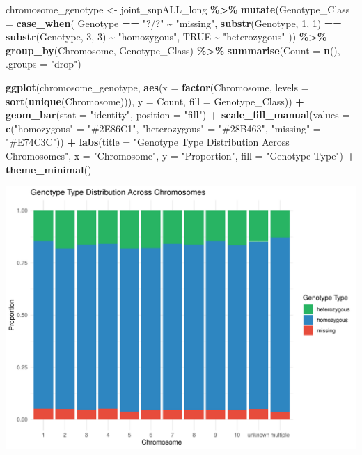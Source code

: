 \documentclass[
]{article}
\newenvironment{Shaded}{\begin{snugshade}}{\end{snugshade}}
\newcommand{\AttributeTok}[1]{\textcolor[rgb]{0.13,0.29,0.53}{#1}}
\newcommand{\ConstantTok}[1]{\textcolor[rgb]{0.56,0.35,0.01}{#1}}
\newcommand{\DecValTok}[1]{\textcolor[rgb]{0.00,0.00,0.81}{#1}}
\newcommand{\FunctionTok}[1]{\textcolor[rgb]{0.13,0.29,0.53}{\textbf{#1}}}
\newcommand{\NormalTok}[1]{#1}
\newcommand{\OtherTok}[1]{\textcolor[rgb]{0.56,0.35,0.01}{#1}}
\newcommand{\SpecialCharTok}[1]{\textcolor[rgb]{0.81,0.36,0.00}{\textbf{#1}}}
\newcommand{\StringTok}[1]{\textcolor[rgb]{0.31,0.60,0.02}{#1}}
\begin{document}
\begin{Shaded}
\begin{Highlighting}[]
\NormalTok{chromosome\_genotype }\OtherTok{\textless{}{-}}\NormalTok{ joint\_snpALL\_long }\SpecialCharTok{\%\textgreater{}\%}
  \FunctionTok{mutate}\NormalTok{(}\AttributeTok{Genotype\_Class =} \FunctionTok{case\_when}\NormalTok{(}
\NormalTok{    Genotype }\SpecialCharTok{==} \StringTok{"?/?"} \SpecialCharTok{\textasciitilde{}} \StringTok{"missing"}\NormalTok{,}
    \FunctionTok{substr}\NormalTok{(Genotype, }\DecValTok{1}\NormalTok{, }\DecValTok{1}\NormalTok{) }\SpecialCharTok{==} \FunctionTok{substr}\NormalTok{(Genotype, }\DecValTok{3}\NormalTok{, }\DecValTok{3}\NormalTok{) }\SpecialCharTok{\textasciitilde{}} \StringTok{"homozygous"}\NormalTok{,}
    \ConstantTok{TRUE} \SpecialCharTok{\textasciitilde{}} \StringTok{"heterozygous"}
\NormalTok{  )) }\SpecialCharTok{\%\textgreater{}\%}
  \FunctionTok{group\_by}\NormalTok{(Chromosome, Genotype\_Class) }\SpecialCharTok{\%\textgreater{}\%}
  \FunctionTok{summarise}\NormalTok{(}\AttributeTok{Count =} \FunctionTok{n}\NormalTok{(), }\AttributeTok{.groups =} \StringTok{"drop"}\NormalTok{)}

\FunctionTok{ggplot}\NormalTok{(chromosome\_genotype, }\FunctionTok{aes}\NormalTok{(}\AttributeTok{x =} \FunctionTok{factor}\NormalTok{(Chromosome, }\AttributeTok{levels =} \FunctionTok{sort}\NormalTok{(}\FunctionTok{unique}\NormalTok{(Chromosome))), }
                                \AttributeTok{y =}\NormalTok{ Count, }\AttributeTok{fill =}\NormalTok{ Genotype\_Class)) }\SpecialCharTok{+}
  \FunctionTok{geom\_bar}\NormalTok{(}\AttributeTok{stat =} \StringTok{"identity"}\NormalTok{, }\AttributeTok{position =} \StringTok{"fill"}\NormalTok{) }\SpecialCharTok{+}  
  \FunctionTok{scale\_fill\_manual}\NormalTok{(}\AttributeTok{values =} \FunctionTok{c}\NormalTok{(}\StringTok{"homozygous"} \OtherTok{=} \StringTok{"\#2E86C1"}\NormalTok{, }\StringTok{"heterozygous"} \OtherTok{=} \StringTok{"\#28B463"}\NormalTok{, }\StringTok{"missing"} \OtherTok{=} \StringTok{"\#E74C3C"}\NormalTok{)) }\SpecialCharTok{+}
  \FunctionTok{labs}\NormalTok{(}\AttributeTok{title =} \StringTok{"Genotype Type Distribution Across Chromosomes"}\NormalTok{,}
       \AttributeTok{x =} \StringTok{"Chromosome"}\NormalTok{, }\AttributeTok{y =} \StringTok{"Proportion"}\NormalTok{, }\AttributeTok{fill =} \StringTok{"Genotype Type"}\NormalTok{) }\SpecialCharTok{+}
  \FunctionTok{theme\_minimal}\NormalTok{()}
\end{Highlighting}
\end{Shaded}

\includegraphics{R_Assignment_files/figure-latex/unnamed-chunk-14-1.pdf}
\end{document}
